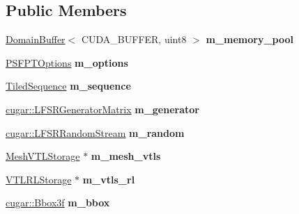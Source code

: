 \subsection*{Public Members}
\begin{DoxyCompactItemize}
\item 
\mbox{\label{struct_p_s_f_p_t_aec66329da554c02442adf8f0844d5d7b}} 
\hyperlink{class_domain_buffer}{Domain\+Buffer}$<$ C\+U\+D\+A\+\_\+\+B\+U\+F\+F\+ER, uint8 $>$ {\bfseries m\+\_\+memory\+\_\+pool}
\item 
\mbox{\label{struct_p_s_f_p_t_a12509d1765bb9abbfe227ba0bc7c9e7a}} 
\hyperlink{struct_p_s_f_p_t_options}{P\+S\+F\+P\+T\+Options} {\bfseries m\+\_\+options}
\item 
\mbox{\label{struct_p_s_f_p_t_aafc44f67e907ab14fb579ef6c582827d}} 
\hyperlink{struct_tiled_sequence}{Tiled\+Sequence} {\bfseries m\+\_\+sequence}
\item 
\mbox{\label{struct_p_s_f_p_t_a9f334cb99db3405d5369d871e5b22d6d}} 
\hyperlink{classcugar_1_1_l_f_s_r_generator_matrix}{cugar\+::\+L\+F\+S\+R\+Generator\+Matrix} {\bfseries m\+\_\+generator}
\item 
\mbox{\label{struct_p_s_f_p_t_af3f2a7be0acb1be68216db08f85c4050}} 
\hyperlink{structcugar_1_1_l_f_s_r_random_stream}{cugar\+::\+L\+F\+S\+R\+Random\+Stream} {\bfseries m\+\_\+random}
\item 
\mbox{\label{struct_p_s_f_p_t_a0db48df1ff644f9d29aad3df573829ff}} 
\hyperlink{struct_mesh_v_t_l_storage}{Mesh\+V\+T\+L\+Storage} $\ast$ {\bfseries m\+\_\+mesh\+\_\+vtls}
\item 
\mbox{\label{struct_p_s_f_p_t_a4a8c7d0353fec5388aa28bbe48a7c13c}} 
\hyperlink{struct_adaptive_clustered_r_l_storage}{V\+T\+L\+R\+L\+Storage} $\ast$ {\bfseries m\+\_\+vtls\+\_\+rl}
\item 
\mbox{\label{struct_p_s_f_p_t_acb12cb391268411459580fda5acba858}} 
\hyperlink{structcugar_1_1_bbox}{cugar\+::\+Bbox3f} {\bfseries m\+\_\+bbox}
\item 
\mbox{\label{struct_p_s_f_p_t_a9835a0c5400c00dcbcc64547db6ca96b}} 

\end{DoxyCompactItemize}

